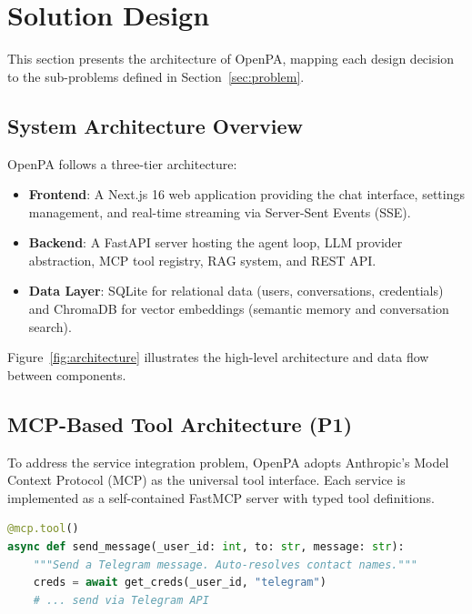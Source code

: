 \section{Solution Design}
\label{sec:solution}

This section presents the architecture of OpenPA, mapping each design decision to the sub-problems defined in Section~\ref{sec:problem}.

\subsection{System Architecture Overview}

OpenPA follows a three-tier architecture:

\begin{itemize}[leftmargin=*]
  \item \textbf{Frontend}: A Next.js 16 \cite{nextjs2024} web application providing the chat interface, settings management, and real-time streaming via Server-Sent Events (SSE).
  \item \textbf{Backend}: A FastAPI \cite{fastapi2024} server hosting the agent loop, LLM provider abstraction, MCP tool registry, RAG system, and REST API.
  \item \textbf{Data Layer}: SQLite for relational data (users, conversations, credentials) and ChromaDB \cite{chromadb2024} for vector embeddings (semantic memory and conversation search).
\end{itemize}

Figure~\ref{fig:architecture} illustrates the high-level architecture and data flow between components.



\subsection{MCP-Based Tool Architecture (P1)}

To address the service integration problem, OpenPA adopts Anthropic's Model Context Protocol (MCP) \cite{anthropic2024mcp} as the universal tool interface. Each service is implemented as a self-contained FastMCP \cite{fastmcp2024} server with typed tool definitions.

\begin{lstlisting}[language=Python, caption={Example tool definition (simplified)}]
@mcp.tool()
async def send_message(_user_id: int, to: str, message: str):
    """Send a Telegram message. Auto-resolves contact names."""
    creds = await get_creds(_user_id, "telegram")
    # ... send via Telegram API
\end{lstlisting}

